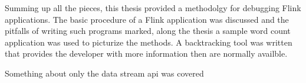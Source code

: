 Summing up all the pieces, this thesis provided a methodolgy for debugging Flink applications. The basic procedure of a Flink application was discussed and the pitfalls of writing such programs marked, along the thesis a sample word count application was used to picturize the methods. A backtracking tool was written that provides the developer with more information then are normally availble.

Something about only the data stream api was covered
